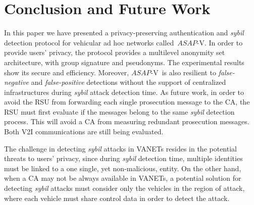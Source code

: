 \documentclass[preprint,12pt]{elsarticle}
\newcommand{\protocolname}{$ASAP$-V}
\begin{document}
\section{Conclusion and Future Work}
\label{sec:conclusion}

In this paper we have presented a privacy-preserving authentication and \textit{sybil} detection protocol for vehicular ad hoc networks called~\protocolname. In order to provide users' privacy, the protocol provides a multilevel anonymity set architecture, with group signature and pseudonyms. The experimental results show its secure and efficiency. Moreover, \protocolname~is also resilient to \textit{false-negative} and \textit{false-positive} detections without the support of centralized infrastructures during \textit{sybil} attack detection time. As future work, in order to avoid the RSU from forwarding each single prosecution message to the CA, the RSU must first evaluate if the messages belong to the same \textit{sybil} detection process. This will avoid a CA from measuring redundant prosecution messages. Both V2I communications are still being evaluated.

The challenge in detecting \textit{sybil} attacks in VANETs resides in the potential threats to users' privacy, since during \textit{sybil} detection time, multiple identities must be linked to a one single, yet non-malicious, entity. On the other hand, when a CA may not be always available in VANETs, a potential solution for detecting \textit{sybil} attacks must consider only the vehicles in the region of attack, where  each vehicle must share control data in order to detect the attack.
\end{document}
